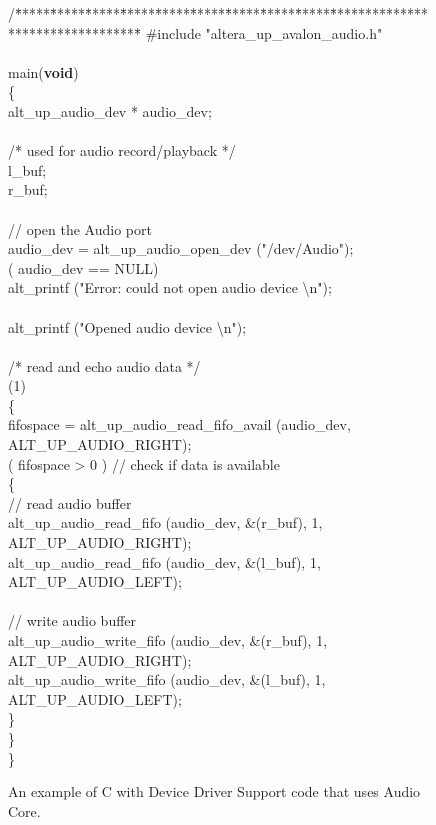 \begin{figure}[h!]
\begin{center}
\begin{minipage}[t]{12.5 cm}
\begin{tabbing}
/\=*****\=*****\=*****\=*****\=*****\=*****\=*****\=*****\=*****\=*********************************\=\kill
\>\#include "altera\_up\_avalon\_audio.h"\\
\>\\
 main({\bf void})\\
\>\{\\
\>\>alt\_up\_audio\_dev * audio\_dev;\\
\>\\
\>\>/* used for audio record/playback */\\
\> l\_buf;\\
\> r\_buf;\\
\>\\
\>\>// open the Audio port\\
\>\>audio\_dev = alt\_up\_audio\_open\_dev ("/dev/Audio");\\
\> ( audio\_dev == NULL)\\
\>\>\>alt\_printf ("Error: could not open audio device \textbackslash n");\\
\>\\
\>\>\>alt\_printf ("Opened audio device \textbackslash n");\\
\>\\
\>\>/* read and echo audio data */\\
\>(1)\\
\>\>\{\\
\>\> fifospace = alt\_up\_audio\_read\_fifo\_avail (audio\_dev, ALT\_UP\_AUDIO\_RIGHT);\\
\>\> ( fifospace > 0 ) 	// check if data is available \\
\>\>\>\{\\
\>\>\>\>// read audio buffer\\
\>\>\>\>alt\_up\_audio\_read\_fifo (audio\_dev, \&(r\_buf), 1, ALT\_UP\_AUDIO\_RIGHT);\\
\>\>\>\>alt\_up\_audio\_read\_fifo (audio\_dev, \&(l\_buf), 1, ALT\_UP\_AUDIO\_LEFT);\\
\>\\
\>\>\>\>// write audio buffer\\
\>\>\>\>alt\_up\_audio\_write\_fifo (audio\_dev, \&(r\_buf), 1, ALT\_UP\_AUDIO\_RIGHT);\\
\>\>\>\>alt\_up\_audio\_write\_fifo (audio\_dev, \&(l\_buf), 1, ALT\_UP\_AUDIO\_LEFT);\\
\>\>\>\}\\
\>\>\}\\
\>\}\\
\end{tabbing}
\end{minipage}
\end{center}
	\vspace{-0.33in}\caption{An example of C with Device Driver Support code that uses Audio Core.}
   \label{fig:HAL_Audio_Example}
\end{figure}
\pagebreak
\clearpage
\newpage

